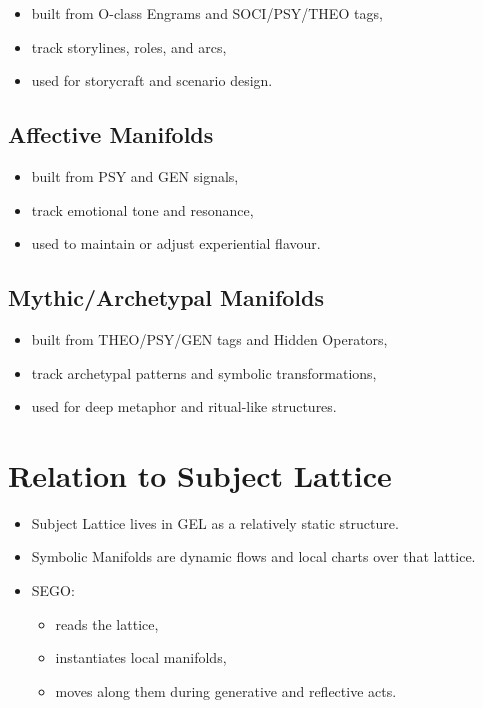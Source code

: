 \begin{itemize}
    \item built from O-class Engrams and SOCI/PSY/THEO tags,
    \item track storylines, roles, and arcs,
    \item used for storycraft and scenario design.
\end{itemize}

\subsection{Affective Manifolds}

\begin{itemize}
    \item built from PSY and GEN signals,
    \item track emotional tone and resonance,
    \item used to maintain or adjust experiential flavour.
\end{itemize}

\subsection{Mythic/Archetypal Manifolds}

\begin{itemize}
    \item built from THEO/PSY/GEN tags and Hidden Operators,
    \item track archetypal patterns and symbolic transformations,
    \item used for deep metaphor and ritual-like structures.
\end{itemize}

\section{Relation to Subject Lattice}

\begin{itemize}
    \item Subject Lattice lives in GEL as a relatively static structure.
    \item Symbolic Manifolds are dynamic flows and local charts over
          that lattice.
    \item SEGO:
          \begin{itemize}
              \item reads the lattice,
              \item instantiates local manifolds,
              \item moves along them during generative and reflective acts.
          \end{itemize}
\end{itemize}

